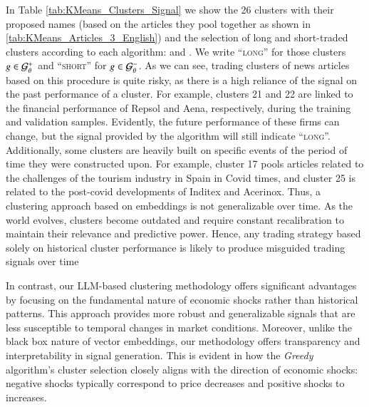 
In Table \ref{tab:KMeans_Clusters_Signal} we show the 26 clusters with their proposed names (based on the articles they pool together as shown in \cref{tab:KMeans_Articles_3_English}) and the selection of long and short-traded clusters according to each algorithm:  and . We write ``\textsc{long}'' for those clusters $g\in\mathcal{G}_\theta^+$ and ``\textsc{short}'' for $g\in\mathcal{G}_\theta^-$. 
%
As we can see, trading clusters of news articles based on this procedure is quite risky, as there is a high reliance of the signal on the past performance of a cluster. For example, clusters 21 and 22 are linked to the financial performance of Repsol and Aena, respectively, during the training and validation samples. Evidently, the future performance of these firms can change, but the signal provided by the algorithm will still indicate ``\textsc{long}''. 
%
Additionally, some clusters are heavily built on specific events of the period of time they were constructed upon. For example, cluster 17 pools articles related to the challenges of the tourism industry in Spain in Covid times, and cluster 25 is related to the post-covid developments of Inditex and Acerinox. Thus, a clustering approach based on embeddings is not generalizable over time. As the world evolves, clusters become outdated and require constant recalibration to maintain their relevance and predictive power. Hence, any trading strategy based solely on historical cluster performance is likely to produce misguided trading signals over time 


In contrast, our LLM-based clustering methodology offers significant advantages by focusing on the fundamental nature of economic shocks rather than historical patterns. This approach provides more robust and generalizable signals that are less susceptible to temporal changes in market conditions. Moreover, unlike the black box nature of vector embeddings, our methodology offers transparency and interpretability in signal generation. This is evident in how the \textit{Greedy} algorithm's cluster selection closely aligns with the direction of economic shocks: negative shocks typically correspond to price decreases and positive shocks to increases. 

